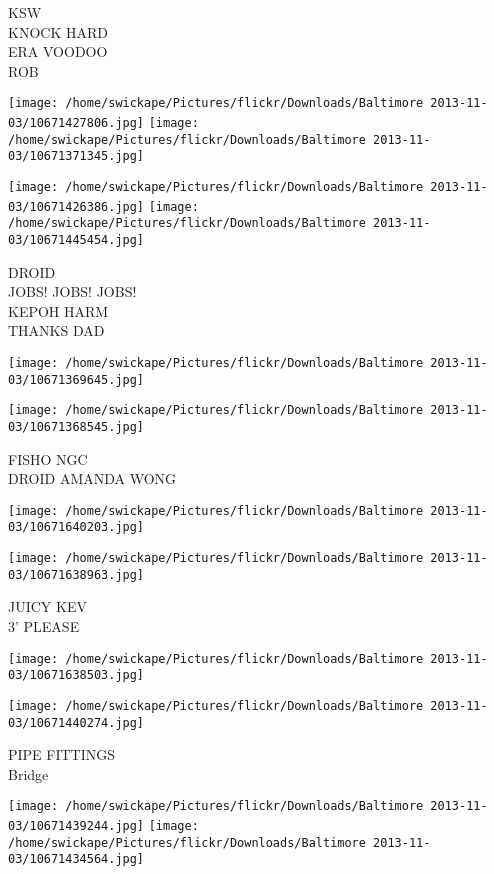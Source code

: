 \documentclass[10pt,letterpaper]{article}
\begin{document}
KSW\\
KNOCK HARD\\
ERA VOODOO\\
ROB
\pagebreak

\texttt{[image: /home/swickape/Pictures/flickr/Downloads/Baltimore 2013-11-03/10671427806.jpg]}
\texttt{[image: /home/swickape/Pictures/flickr/Downloads/Baltimore 2013-11-03/10671371345.jpg]}

\texttt{[image: /home/swickape/Pictures/flickr/Downloads/Baltimore 2013-11-03/10671426386.jpg]}
\texttt{[image: /home/swickape/Pictures/flickr/Downloads/Baltimore 2013-11-03/10671445454.jpg]}

DROID\\
JOBS! JOBS! JOBS!\\
KEPOH HARM\\
THANKS DAD
\pagebreak

\texttt{[image: /home/swickape/Pictures/flickr/Downloads/Baltimore 2013-11-03/10671369645.jpg]}

\vspace{0.25in}
\texttt{[image: /home/swickape/Pictures/flickr/Downloads/Baltimore 2013-11-03/10671368545.jpg]}

FISHO NGC\\
DROID AMANDA WONG
\pagebreak

\texttt{[image: /home/swickape/Pictures/flickr/Downloads/Baltimore 2013-11-03/10671640203.jpg]}

\vspace{0.25in}
\texttt{[image: /home/swickape/Pictures/flickr/Downloads/Baltimore 2013-11-03/10671638963.jpg]}

JUICY KEV\\
3' PLEASE
\pagebreak

\texttt{[image: /home/swickape/Pictures/flickr/Downloads/Baltimore 2013-11-03/10671638503.jpg]}

\vspace{0.25in}
\texttt{[image: /home/swickape/Pictures/flickr/Downloads/Baltimore 2013-11-03/10671440274.jpg]}

PIPE FITTINGS\\
Bridge
\pagebreak

\texttt{[image: /home/swickape/Pictures/flickr/Downloads/Baltimore 2013-11-03/10671439244.jpg]}
\texttt{[image: /home/swickape/Pictures/flickr/Downloads/Baltimore 2013-11-03/10671434564.jpg]}
\end{document}
